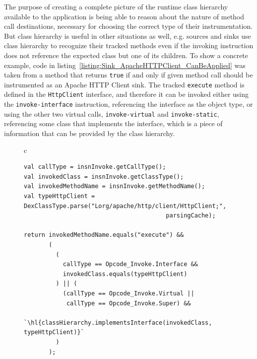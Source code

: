 \documentclass[12pt,twoside,notitlepage]{report}
\begin{document}
The purpose of creating a complete picture of the runtime class hierarchy available to the application is being able to reason about the nature of method call destinations, necessary for choosing the correct type of their instrumentation. But class hierarchy is useful in other situations as well, e.g. sources and sinks use class hierarchy to recognize their tracked methods even if the invoking instruction does not reference the expected class but one of its children. To show a concrete example, code in listing~\ref{listing:Sink_ApacheHTTPClient_CanBeApplied} was taken from a method that returns \verb$true$ if and only if given method call should be instrumented as an Apache HTTP Client sink. The tracked \verb$execute$ method is defined in the \verb$HttpClient$ interface, and therefore it can be invoked either using the \verb$invoke-interface$ instruction, referencing the interface as the object type, or using the other two virtual calls, \verb$invoke-virtual$ and \verb$invoke-static$, referencing some class that implements the interface, which is a piece of information that can be provided by the class hierarchy. 

\begin{figure}[h]
	\centering
	\begin{tabular}{c}
	\begin{lstlisting}
val callType = insnInvoke.getCallType();
val invokedClass = insnInvoke.getClassType();
val invokedMethodName = insnInvoke.getMethodName();
val typeHttpClient = DexClassType.parse("Lorg/apache/http/client/HttpClient;", 
                                        parsingCache);

return invokedMethodName.equals("execute") &&
       (
         (
           callType == Opcode_Invoke.Interface && 
           invokedClass.equals(typeHttpClient)
         ) || (
           (callType == Opcode_Invoke.Virtual || 
           	callType == Opcode_Invoke.Super) && 
           `\hl{classHierarchy.implementsInterface(invokedClass, typeHttpClient)}`
         )
       );
	\end{lstlisting}
	\end{tabular}
	\begin{lstlisting}[caption={Code that decides whether a method call given by instruction in \texttt{insnInvoke} should be instrumented as an Apache HTTP Client sink.},
	                   label={listing:Sink_ApacheHTTPClient_CanBeApplied}]
	\end{lstlisting}
\end{figure}
\end{document}
